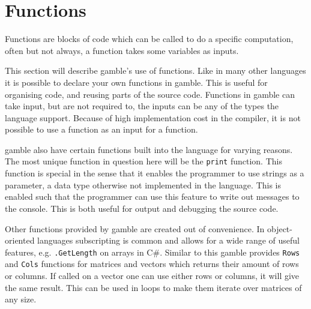 \section{Functions}\label{sec:funcs}
Functions are blocks of code which can be called to do a specific computation, often but not always, a function takes some variables as inputs.

This section will describe \gls{gamble}'s use of functions. 
Like in many other languages it is possible to declare your own functions in \gls{gamble}.
This is useful for organising code, and reusing parts of the source code.
Functions in \gls{gamble} can take input, but are not required to, the inputs can be any of the types the language support.
Because of high implementation cost in the compiler, it is not possible to use a function as an input for a function.

\gls{gamble} also have certain functions built into the language for varying reasons.
The most unique function in question here will be the \texttt{print} function.
This function is special in the sense that it enables the programmer to use strings as a parameter, a data type otherwise not implemented in the language.
This is enabled such that the programmer can use this feature to write out messages to the console. 
This is both useful for output and debugging the source code.

Other functions provided by \gls{gamble} are created out of convenience.
In object-oriented languages subscripting is common and allows for a wide range of useful features, e.g. \texttt{.GetLength} on arrays in C\#.
Similar to this \gls{gamble} provides \texttt{Rows} and \texttt{Cols} functions for matrices and vectors which returns their amount of rows or columns.
If called on a vector one can use either rows or columns, it will give the same result.
This can be used in loops to make them iterate over matrices of any size.


